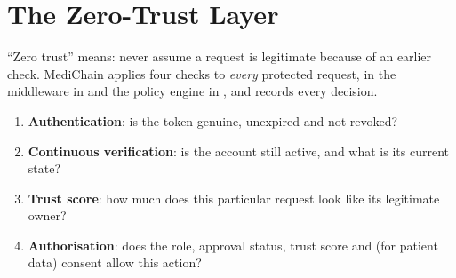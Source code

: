 \chapter{The Zero-Trust Layer}\label{ch:zerotrust}

``Zero trust'' means: never assume a request is legitimate because of an
earlier check. MediChain applies four checks to \emph{every} protected request,
in the middleware in  and the policy engine in
, and records every decision.

\begin{enumerate}
  \item \textbf{Authentication}: is the token genuine, unexpired and not revoked?
  \item \textbf{Continuous verification}: is the account still active, and what
    is its current state?
  \item \textbf{Trust score}: how much does this particular request look like
    its legitimate owner?
  \item \textbf{Authorisation}: does the role, approval status, trust score and
    (for patient data) consent allow this action?
\end{enumerate}

\section{}

